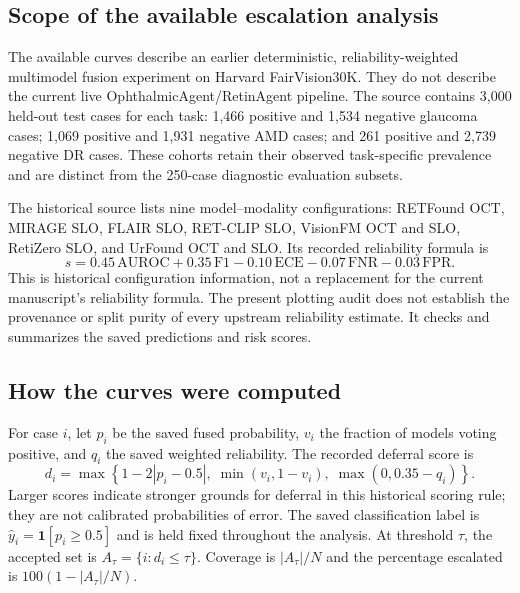 
\subsection*{Scope of the available escalation analysis}

The available curves describe an earlier deterministic, reliability-weighted
multimodel fusion experiment on Harvard FairVision30K. They do not describe
the current live OphthalmicAgent/RetinAgent pipeline. The source contains
3,000 held-out test cases for each task: 1,466 positive and 1,534 negative
glaucoma cases; 1,069 positive and 1,931 negative AMD cases; and 261 positive
and 2,739 negative DR cases. These cohorts retain their observed task-specific
prevalence and are distinct from the 250-case diagnostic evaluation subsets.

The historical source lists nine model--modality configurations: RETFound
OCT, MIRAGE SLO, FLAIR SLO, RET-CLIP SLO, VisionFM OCT and SLO, RetiZero SLO,
and UrFound OCT and SLO. Its recorded reliability formula is
\begin{equation}
s = 0.45\,\mathrm{AUROC} + 0.35\,\mathrm{F1}
    - 0.10\,\mathrm{ECE} - 0.07\,\mathrm{FNR} - 0.03\,\mathrm{FPR}.
\end{equation}
This is historical configuration information, not a replacement for the
current manuscript's reliability formula. The present plotting audit does
not establish the provenance or split purity of every upstream reliability
estimate. It checks and summarizes the saved predictions and risk scores.

\subsection*{How the curves were computed}

For case $i$, let $p_i$ be the saved fused probability, $v_i$ the fraction of
models voting positive, and $q_i$ the saved weighted reliability. The recorded
deferral score is
\begin{equation}
d_i = \max\left\{1-2|p_i-0.5|,\;
                  \min(v_i,1-v_i),\;
                  \max(0,0.35-q_i)\right\}.
\end{equation}
Larger scores indicate stronger grounds for deferral in this historical
scoring rule; they are not calibrated probabilities of error. The saved
classification label is $\hat y_i=\mathbf{1}[p_i\geq0.5]$ and is held fixed
throughout the analysis. At threshold $\tau$, the accepted set is
$A_\tau=\{i:d_i\leq\tau\}$. Coverage is $|A_\tau|/N$ and the percentage
escalated is $100(1-|A_\tau|/N)$.

